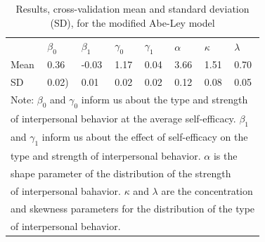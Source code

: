 \documentclass[man]{apa6}
\theoremstyle{definition}
\theoremstyle{definition}
\theoremstyle{definition}
\theoremstyle{remark}
\begin{document}
\begin{table}
\begin{tabular}[t]{lllllll}
\end{tabular}
\end{table}

\begin{table}

\caption{\label{tab:estAL}Results, cross-validation mean and standard deviation (SD), for the modified Abe-Ley model}
\centering
\begin{tabular}[t]{llllllll}
\toprule
& $\beta_0$ & $\beta_1$ & $\gamma_0$  & $\gamma_1$ & $\alpha$ & $\kappa$ & $\lambda$\\
Mean & 0.36 & -0.03 & 1.17 & 0.04 & 3.66 & 1.51 & 0.70 \\
SD & 0.02) & 0.01 & 0.02 & 0.02 & 0.12 & 0.08 & 0.05\\
\bottomrule
\multicolumn{8}{l}{Note: $\beta_0$  and $\gamma_0$ inform us about the type and strength }\\
\multicolumn{8}{l}{of interpersonal behavior at the average self-efficacy. $\beta_1$ }\\
\multicolumn{8}{l}{and $\gamma_1$ inform us about the effect of self-efficacy on the}\\
\multicolumn{8}{l}{type and strength of interpersonal behavior. $\alpha$ is the } \\
\multicolumn{8}{l}{shape parameter of the distribution of the strength }\\
\multicolumn{8}{l}{of interpersonal bahavior. $\kappa$ and $\lambda$ are the concentration}\\
\multicolumn{8}{l}{and skewness parameters for the distribution of the type}\\
\multicolumn{8}{l}{of interpersonal behavior.}\\
\end{tabular}
\end{table}
\end{document}
